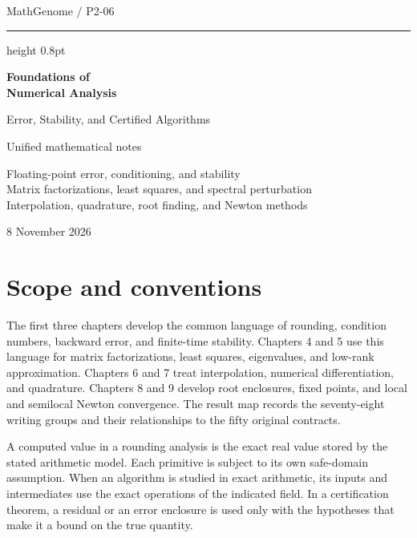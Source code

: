 \documentclass[11pt,oneside,openany]{book}
\theoremstyle{plain}
\theoremstyle{definition}
\theoremstyle{remark}
\begin{document}
\frontmatter
\hypersetup{pageanchor=false}
\begin{titlepage}
\thispagestyle{empty}
\vspace*{27mm}
{\large MathGenome \enspace / \enspace P2-06\par}
\vspace{8mm}
\hrule height 0.8pt
\vspace{11mm}
{\Huge\bfseries Foundations of\\[3pt] Numerical Analysis\par}
\vspace{4mm}
{\LARGE Error, Stability, and Certified Algorithms\par}
\vspace{12mm}
{\large Unified mathematical notes\par}
\vspace{6mm}
{\normalsize Floating-point error, conditioning, and stability\\
Matrix factorizations, least squares, and spectral perturbation\\
Interpolation, quadrature, root finding, and Newton methods\par}
\vfill
{\large 8 November 2026\par}
\end{titlepage}
\hypersetup{pageanchor=true}
\begingroup
\small
\setlength{\baselineskip}{10.6pt}
\tableofcontents
\endgroup

\chapter*{Scope and conventions}

The first three chapters develop the common language of rounding,
condition numbers, backward error, and finite-time stability.
Chapters 4 and 5 use this language for matrix factorizations,
least squares, eigenvalues, and low-rank approximation.
Chapters 6 and 7 treat interpolation, numerical differentiation,
and quadrature. Chapters 8 and 9 develop root enclosures, fixed
points, and local and semilocal Newton convergence.
The result map records the seventy-eight writing groups and
their relationships to the fifty original contracts.

A computed value in a rounding analysis is the exact real value
stored by the stated arithmetic model. Each primitive is subject to
its own safe-domain assumption. When an algorithm is studied
in exact arithmetic, its inputs and intermediates use the exact
operations of the indicated field. In a certification theorem,
a residual or an error enclosure is used only with the hypotheses
that make it a bound on the true quantity.
\end{document}
